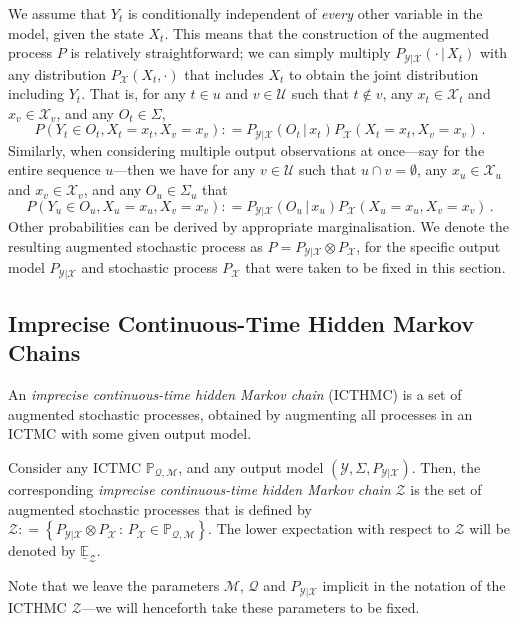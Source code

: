 \documentclass[twoside,11pt]{article}
\newcommand{\states}{\mathcal{X}}
\newcommand{\observs}{\mathcal{Y}}
\newcommand{\rateset}{\mathcal{Q}}
\newcommand{\coloneqq}{:\!=}
\begin{document}
We assume that $Y_t$ is conditionally independent of \emph{every} other variable in the model, given the state $X_t$. This means that the construction of the augmented process $P$ is relatively straightforward; we can simply multiply $P_{\observs\vert\states}(\cdot\,\vert\,X_t)$ with any distribution $P_\states(X_t,\cdot)$ that includes $X_t$ to obtain the joint distribution including $Y_t$. That is, for any $t\in u$ and $v\in\mathcal{U}$ such that $t\notin v$, any $x_t\in\states_t$ and $x_v\in\states_v$, and any $O_t\in\Sigma$,
\begin{equation*}
P(Y_t\in O_t,X_t=x_t,X_v=x_v) \coloneqq P_{\observs\vert\states}(O_t\,\vert\,x_t)P_\states(X_t=x_t,X_v=x_v)\,.
\end{equation*}
Similarly, when considering multiple output observations at once---say for the entire sequence $u$---then we have for any $v\in\mathcal{U}$ such that $u\cap v=\emptyset$, any $x_u\in\states_u$ and $x_v\in\states_v$, and any $O_u\in\Sigma_u$ that
\begin{equation*}
P(Y_u\in O_u,X_u=x_u, X_v=x_v) \coloneqq P_{\observs\vert\states}(O_{u}\,\vert\,x_{u})P_\states(X_u=x_u,X_v=x_v)\,.
\end{equation*}
Other probabilities can be derived by appropriate marginalisation.
We denote the resulting augmented stochastic process as $P=P_{\observs\vert\states}\otimes P_\states$,
for the specific output model $P_{\observs\vert\states}$ and stochastic process $P_\states$ that were taken to be fixed in this section.%

\subsection{Imprecise Continuous-Time Hidden Markov Chains}\label{subsec:ICTHMC}

An \emph{imprecise continuous-time hidden Markov chain} (ICTHMC) is a set of augmented stochastic processes, obtained by augmenting all processes in an ICTMC with some given output model.
\begin{definition}[ICTHMC]\label{def:hidden_ictmc}
Consider any ICTMC $\mathbb{P}_{\rateset,\mathcal{M}}$, and any output model $(\observs,\Sigma,P_{\observs\vert\states})$. Then, the corresponding \emph{imprecise continuous-time hidden Markov chain} $\mathcal{Z}$ is the set of augmented stochastic processes that is defined by
$\mathcal{Z} \coloneqq \left\{ P_{\observs\vert\states}\otimes P_{\states} \,:\, P_{\states}\in\mathbb{P}_{\rateset,\mathcal{M}}\right\}$.
The lower expectation with respect to $\mathcal{Z}$ will be denoted by $\underline{\mathbb{E}}_\mathcal{Z}$.
\end{definition}
Note that we leave the parameters $\mathcal{M}$, $\rateset$ and $P_{\observs\vert\states}$ implicit in the notation of the ICTHMC $\mathcal{Z}$---we will henceforth take these parameters to be fixed.
\end{document}
